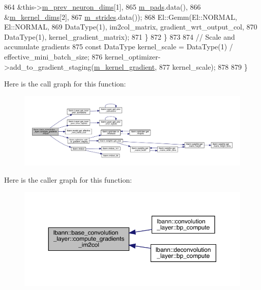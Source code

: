 \begin{DoxyCode}
864                &this->\hyperlink{classlbann_1_1Layer_ae204d1a2a79606eaa117273857ff62a3}{m\_prev\_neuron\_dims}[1],
865                \hyperlink{classlbann_1_1base__convolution__layer_a9732a8a0170a413bf0cde0128ad2a571}{m\_pads}.data(),
866                &\hyperlink{classlbann_1_1base__convolution__layer_a283edb6a476f975e713d0b4235ac658f}{m\_kernel\_dims}[2],
867                \hyperlink{classlbann_1_1base__convolution__layer_a2429495822363e41f1f6b96a6b430445}{m\_strides}.data());
868         El::Gemm(El::NORMAL, El::NORMAL,
869                  DataType(1), im2col\_matrix, gradient\_wrt\_output\_col,
870                  DataType(1), kernel\_gradient\_matrix);
871       \}
872     \}
873 
874     \textcolor{comment}{// Scale and accumulate gradients}
875     \textcolor{keyword}{const} DataType kernel\_scale = DataType(1) / effective\_mini\_batch\_size;
876     kernel\_optimizer->add\_to\_gradient\_staging(\hyperlink{classlbann_1_1base__convolution__layer_a4129f11df61ed92bcad24ae855d7bd11}{m\_kernel\_gradient},
877                                               kernel\_scale);
878 
879   \}
\end{DoxyCode}
Here is the call graph for this function\+:\nopagebreak
\begin{figure}[H]
\begin{center}
\leavevmode
\includegraphics[width=350pt]{classlbann_1_1base__convolution__layer_a8cb0b4fb33f058ce6c211ebaf6a17f63_cgraph}
\end{center}
\end{figure}
Here is the caller graph for this function\+:\nopagebreak
\begin{figure}[H]
\begin{center}
\leavevmode
\includegraphics[width=350pt]{classlbann_1_1base__convolution__layer_a8cb0b4fb33f058ce6c211ebaf6a17f63_icgraph}
\end{center}
\end{figure}
\mbox{\label{classlbann_1_1base__convolution__layer_ad31a2eac6843bd8643538530f1017c32}} 
